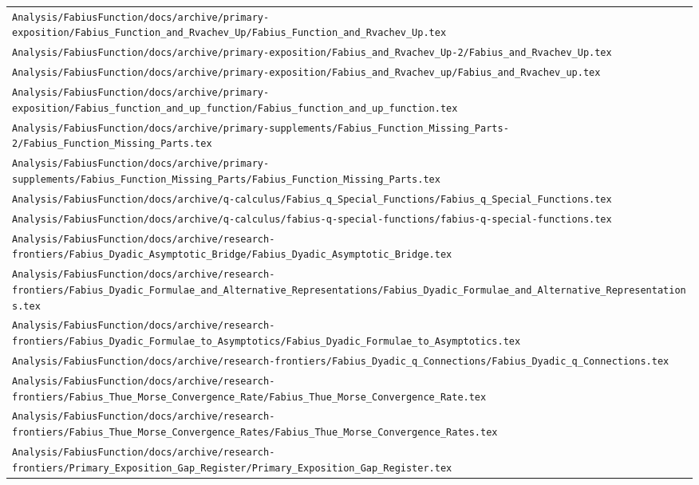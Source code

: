 \begin{longtable}{@{}p{\textwidth}@{}}
\nolinkurl{Analysis/FabiusFunction/docs/archive/primary-exposition/Fabius_Function_and_Rvachev_Up/Fabius_Function_and_Rvachev_Up.tex}\\[0.12em]
\nolinkurl{Analysis/FabiusFunction/docs/archive/primary-exposition/Fabius_and_Rvachev_Up-2/Fabius_and_Rvachev_Up.tex}\\[0.12em]
\nolinkurl{Analysis/FabiusFunction/docs/archive/primary-exposition/Fabius_and_Rvachev_up/Fabius_and_Rvachev_up.tex}\\[0.12em]
\nolinkurl{Analysis/FabiusFunction/docs/archive/primary-exposition/Fabius_function_and_up_function/Fabius_function_and_up_function.tex}\\[0.12em]
\nolinkurl{Analysis/FabiusFunction/docs/archive/primary-supplements/Fabius_Function_Missing_Parts-2/Fabius_Function_Missing_Parts.tex}\\[0.12em]
\nolinkurl{Analysis/FabiusFunction/docs/archive/primary-supplements/Fabius_Function_Missing_Parts/Fabius_Function_Missing_Parts.tex}\\[0.12em]
\nolinkurl{Analysis/FabiusFunction/docs/archive/q-calculus/Fabius_q_Special_Functions/Fabius_q_Special_Functions.tex}\\[0.12em]
\nolinkurl{Analysis/FabiusFunction/docs/archive/q-calculus/fabius-q-special-functions/fabius-q-special-functions.tex}\\[0.12em]
\nolinkurl{Analysis/FabiusFunction/docs/archive/research-frontiers/Fabius_Dyadic_Asymptotic_Bridge/Fabius_Dyadic_Asymptotic_Bridge.tex}\\[0.12em]
\nolinkurl{Analysis/FabiusFunction/docs/archive/research-frontiers/Fabius_Dyadic_Formulae_and_Alternative_Representations/Fabius_Dyadic_Formulae_and_Alternative_Representations.tex}\\[0.12em]
\nolinkurl{Analysis/FabiusFunction/docs/archive/research-frontiers/Fabius_Dyadic_Formulae_to_Asymptotics/Fabius_Dyadic_Formulae_to_Asymptotics.tex}\\[0.12em]
\nolinkurl{Analysis/FabiusFunction/docs/archive/research-frontiers/Fabius_Dyadic_q_Connections/Fabius_Dyadic_q_Connections.tex}\\[0.12em]
\nolinkurl{Analysis/FabiusFunction/docs/archive/research-frontiers/Fabius_Thue_Morse_Convergence_Rate/Fabius_Thue_Morse_Convergence_Rate.tex}\\[0.12em]
\nolinkurl{Analysis/FabiusFunction/docs/archive/research-frontiers/Fabius_Thue_Morse_Convergence_Rates/Fabius_Thue_Morse_Convergence_Rates.tex}\\[0.12em]
\nolinkurl{Analysis/FabiusFunction/docs/archive/research-frontiers/Primary_Exposition_Gap_Register/Primary_Exposition_Gap_Register.tex}\\[0.12em]

\end{longtable}
